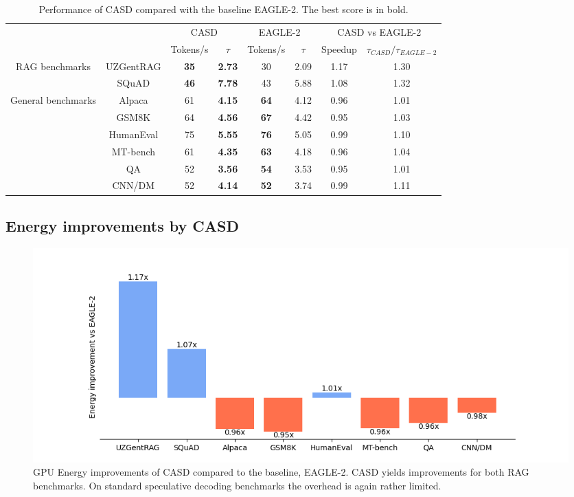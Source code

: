 \begin{table}[h]
    \centering
    \begin{tabular}{cccc|cc|cc}
        & & \multicolumn{2}{c}{CASD} & \multicolumn{2}{c}{EAGLE-2} & \multicolumn{2}{c}{CASD vs EAGLE-2} \\
        \cline{3-8}
        & & Tokens/s & $\tau$ & Tokens/s & $\tau$ & Speedup & $\tau_{CASD} / \tau_{EAGLE-2}$ \\
        \hline
        \multirow{2}{*}{RAG benchmarks} & UZGentRAG & \textbf{35} & \textbf{2.73} & 30 & 2.09 & 1.17 & 1.30 \\
        & SQuAD             & \textbf{46} & \textbf{7.78} & 43 & 5.88 & 1.08 & 1.32 \\
        \hline
        \multirow{6}{*}{General benchmarks} & Alpaca & 61 & \textbf{4.15} & \textbf{64} & 4.12 & 0.96 & 1.01 \\
        & GSM8K             & 64 & \textbf{4.56} & \textbf{67} & 4.42 & 0.95 & 1.03 \\
        & HumanEval         & 75 & \textbf{5.55} & \textbf{76} & 5.05 & 0.99 & 1.10 \\
        & MT-bench          & 61 & \textbf{4.35} & \textbf{63} & 4.18 & 0.96 & 1.04 \\
        & QA                & 52 & \textbf{3.56} & \textbf{54} & 3.53 & 0.95 & 1.01 \\
        & CNN/DM            & 52 & \textbf{4.14} & \textbf{52} & 3.74 & 0.99 & 1.11 \\
        \hline
    \end{tabular}
    \caption{Performance of CASD compared with the baseline EAGLE-2. The best score is in bold.}
    \label{tab:performance_benchmarks}
\end{table}

\subsection{Energy improvements by CASD}
\begin{figure}[h]
  \centering
  \includegraphics[width=\linewidth]{fig/energy_vs_eagle.png}
  \caption{GPU Energy improvements of CASD compared to the baseline, EAGLE-2. CASD yields improvements for both RAG benchmarks. On standard speculative decoding benchmarks the overhead is again rather limited.}
  \label{fig:energy_vs_eagle}
\end{figure}

